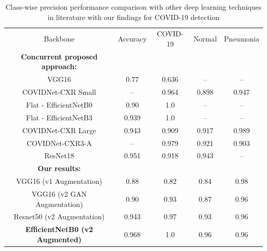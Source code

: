 \begin{table}{
     \centering
    \caption{Class-wise precision performance comparison with other deep learning techniques in literature with our findings for COVID-19 detection}   \label{table:performance_comparison}
  \begin{tabularx}{0.99\textwidth}{c c |c c c }
    \toprule
    Backbone & Accuracy & COVID-19& Normal  &Pneumonia\\
    \otoprule


   
    \bf{Concurrent proposed approach:} &&&& \\
        
  VGG16  \cite{luz2020efficient}&0.77&0.636&--&--\\
    
     
 
        COVIDNet-CXR Small \cite{wang2020covid}&--&0.964&0.898&0.947  \\  
     Flat - EfficientNetB0 \cite{luz2020efficient}&0.90&1.0&--&--\\
     Flat - EfficientNetB3 \cite{luz2020efficient}&0.939&1.0&--&--\\
     COVIDNet-CXR Large \cite{wang2020covid}&0.943&0.909&0.917&0.989 \\
     COVIDNet-CXR3-A\cite{wang2020covid}&--&0.979&0.921&0.903 \\
     ResNet18  \cite{abbas2020classification}&0.951&0.918&0.943&--\\
     \hline
     
         
     \bf{Our results:} &&&& \\
     VGG16 (v1 Augmentation)&0.88&0.82&0.84 & 0.98\\
    VGG16 (v2 GAN Augmentation) &0.90 &0.93&0.87&0.96\\
    Resnet50 (v2 Augmentation)&0.943&0.97& 0.93& 0.96 \\
 \bf{ EfficientNetB0 (v2 Augmented)} &0.968 &1.0&0.96&0.96 \\
     
 
    \bottomrule
  \end{tabularx}}
\end{table}

